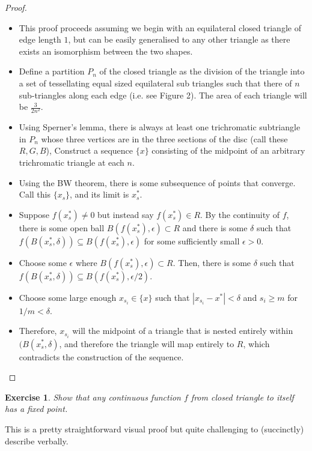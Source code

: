 \documentclass[12pt]{article}
\newtheorem{exercise}{Exercise}
\begin{document}
\begin{proof}
    \begin{itemize}
        \item This proof proceeds assuming we begin with an equilateral closed triangle of edge length $1$, but can be easily generalised to any other triangle as there exists an isomorphism between the two shapes.
        \item Define a partition $P_n$ of the closed triangle as the division of the triangle into a set of tessellating equal sized equilateral sub triangles such that there of $n$ sub-triangles along each edge (i.e. see Figure 2). The area of each triangle will be $\frac{3}{2n^2}$.
        \item Using Sperner's lemma, there is always at least one trichromatic subtriangle in $P_n$ whose three vertices are in the three sections of the disc (call these $R, G, B$), Construct a sequence $\{x\}$ consisting of the midpoint of an arbitrary trichromatic triangle at each $n$.
        \item Using the BW theorem, there is some subsequence of points that converge. Call this $\{x_s\}$, and its limit is $x_s^*$.
        \item Suppose $f(x^*_s) \neq 0$ but instead say $f(x^*_s) \in R$. By the continuity of $f$, there is some open ball $B(f(x^*_s),\epsilon) \subset R$ and there is some $\delta$ such that $f(B(x^*_s,\delta)) \subseteq B(f(x^*_s),\epsilon)$ for some sufficiently small $\epsilon > 0$.
        \item Choose some $\epsilon$ where $B(f(x^*_s),\epsilon) \subset R$. Then, there is some $\delta$ such that $f(B(x^*_s,\delta)) \subseteq B(f(x^*_s),\epsilon/2)$.
        \item Choose some large enough $x_{s_i} \in \{x\}$ such that $|x_{s_i} - x^*| < \delta$ and $s_i \geq m$ for $1/m < \delta$.
        \item Therefore, $x_{s_i}$ will the midpoint of a triangle that is nested entirely within $(B(x^*_s,\delta)$, and therefore the triangle will map entirely to $R$, which contradicts the construction of the sequence.
    \end{itemize}
\end{proof}

\begin{exercise}
    Show that any continuous function $f$ from closed triangle to itself has a fixed point.
\end{exercise}

This is a pretty straightforward visual proof but quite challenging to (succinctly) describe verbally.
\end{document}
